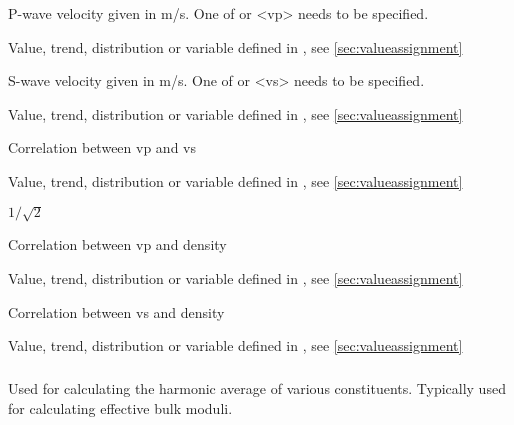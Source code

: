 {
 \slist
   \item \Description P-wave velocity given in m/s. One of  or <vp> needs to be specified.
   \item \Argument Value, trend, distribution or variable defined in , see \autoref{sec:valueassignment}
   \item \Default 
 \elist

 \slist
   \item \Description S-wave velocity given in m/s. One of  or <vs> needs to be specified.
   \item \Argument Value, trend, distribution or variable defined in , see \autoref{sec:valueassignment}
   \item \Default 
 \elist

 \slist
   \item \Description Correlation between vp and vs
   \item \Argument Value, trend, distribution or variable defined in , see \autoref{sec:valueassignment}
   \item \Default $1/\sqrt{2}$
 \elist

 \slist
   \item \Description Correlation between vp and density
   \item \Argument Value, trend, distribution or variable defined in , see \autoref{sec:valueassignment}
   \item {}
 \elist

 \slist
   \item \Description Correlation between vs and density
   \item \Argument Value, trend, distribution or variable defined in , see \autoref{sec:valueassignment}
   \item {}
 \elist

\subparagraph{}
 \slist
   \item \Description Used for calculating the harmonic average of various constituents. Typically used for calculating effective bulk moduli. 
   \item \Argument
   \item \Default 
 \elist

}
